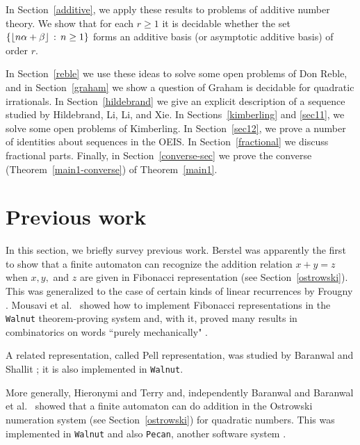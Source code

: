 \documentclass[12pt,reqno]{article}
\begin{document}
In Section~\ref{additive}, we apply these results to problems of additive number theory.   We show
that for each $r \geq 1$ it is decidable whether the set
$\{  \lfloor n \alpha + \beta \rfloor \, : \, n \geq 1 \}$
forms an additive basis (or asymptotic additive basis) of order $r$.  

In Section~\ref{reble}
we use these ideas to solve some open problems of
Don Reble, and in Section~\ref{graham} we show a question of Graham is
decidable for quadratic irrationals.
In Section~\ref{hildebrand} we give an explicit
description of a sequence studied by Hildebrand, Li, Li, and Xie.   In Sections~\ref{kimberling} and \ref{sec11}, we solve some open problems of Kimberling.   
In Section~\ref{sec12}, 
we prove a number of identities about sequences in the OEIS.
In Section~\ref{fractional} we discuss fractional parts. Finally,
in Section~\ref{converse-sec} we
prove the converse (Theorem~\ref{main1-converse}) of Theorem~\ref{main1}.

\section{Previous work}
\label{history}

In this section, we briefly survey previous work.
Berstel \cite{Berstel:1982,Berstel:1986b} was apparently the first to show that a finite automaton can recognize the addition relation
$x+y=z$ when $x, y,$ and $z$ are given in Fibonacci
representation (see Section~\ref{ostrowski}).  This
was generalized to the case of certain kinds of linear
recurrences by Frougny \cite{Frougny:1988,Frougny:1991b,Frougny:1992a}.   Mousavi et al.\ \cite{Mousavi&Schaeffer&Shallit:2016} showed how to implement Fibonacci representations in the {\tt Walnut} theorem-proving system and, with it, proved many results in combinatorics on words ``purely mechanically" \cite{Du&Mousavi&Rowland&Schaeffer&Shallit:2017,Du&Mousavi&Schaeffer&Shallit:2016}.

A related representation, called Pell representation, was studied by Baranwal and Shallit \cite{Baranwal&Shallit:2019}; it is also implemented in {\tt Walnut}.

More generally, Hieronymi and Terry \cite{Hieronymi&Terry:2018} and, independently
Baranwal \cite{Baranwal:2020} and
Baranwal et al.\ \cite{Baranwal&Schaeffer&Shallit:2021} showed that a finite automaton can do addition in the Ostrowski numeration system (see Section~\ref{ostrowski}) for quadratic numbers.  This was implemented in {\tt Walnut} and also
{\tt Pecan}, another software system \cite{Hieronymi:2022}.
\end{document}
